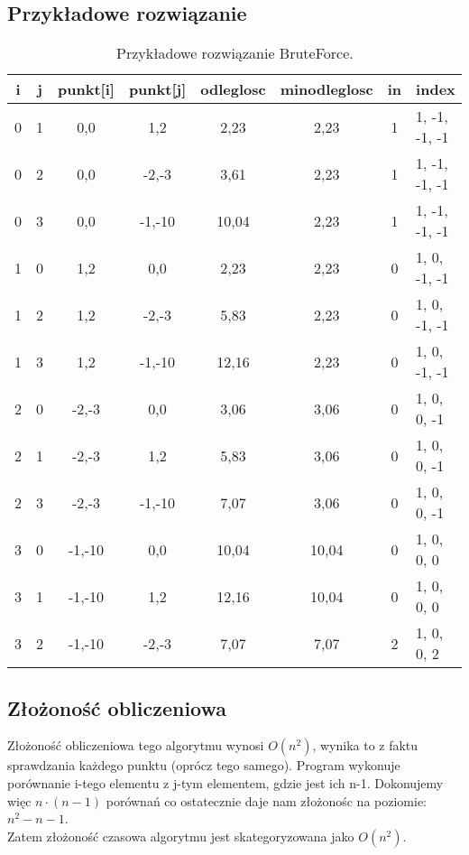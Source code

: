 \documentclass[12pt,twoside]{article}
\begin{document}
\subsection{Przykładowe rozwiązanie}
\begin{table}[ht]
    \centering
    \begin{tabularx}{\textwidth}{|c|c|c|c|c|c|c|X|}
        \hline
        \textbf{i} & \textbf{j} & \textbf{punkt[i]} & \textbf{punkt[j]} & \textbf{odleglosc} & \textbf{minodleglosc} & \textbf{in} & \textbf{index} \\
        \hline
        0 & 1 & 0,0 & 1,2 & 2,23 & 2,23 & 1 & 1, -1, -1, -1 \\
        \hline
        0 & 2 & 0,0 & -2,-3 & 3,61 & 2,23 & 1 & 1, -1, -1, -1 \\
        \hline
        0 & 3 & 0,0 & -1,-10 & 10,04 & 2,23 & 1 & 1, -1, -1, -1 \\
        \hline
        1 & 0 & 1,2  & 0,0 & 2,23 & 2,23 & 0 & 1, 0, -1, -1 \\
        \hline
        1 & 2 & 1,2  & -2,-3 & 5,83 & 2,23 & 0 & 1, 0, -1, -1 \\
        \hline
        1 & 3 & 1,2  & -1,-10 & 12,16 & 2,23 & 0 & 1, 0, -1, -1 \\
        \hline
        2 & 0 & -2,-3  & 0,0 & 3,06 & 3,06 & 0 & 1, 0, 0, -1 \\
		\hline
        2 & 1 & -2,-3  & 1,2 & 5,83 & 3,06 & 0 & 1, 0, 0, -1 \\
		\hline
        2 & 3 & -2,-3  & -1,-10 & 7,07 & 3,06 & 0 & 1, 0, 0, -1 \\
		\hline
        3 & 0 & -1,-10  & 0,0 & 10,04 & 10,04 & 0 & 1, 0, 0, 0 \\
        \hline
        3 & 1 & -1,-10  & 1,2 & 12,16 & 10,04 & 0 & 1, 0, 0, 0 \\
		\hline
        3 & 2 & -1,-10  & -2,-3 & 7,07 & 7,07 & 2 & 1, 0, 0, 2\\
		\hline
    \end{tabularx}
    \caption{Przykładowe rozwiązanie BruteForce.}
    \label{tab:bruteforceprzyklad}
\end{table}

\subsection{Złożoność obliczeniowa}
Złożoność obliczeniowa tego algorytmu wynosi \(O(n^2)\), wynika to z faktu sprawdzania każdego punktu (oprócz tego samego). 
Program wykonuje porównanie i-tego elementu z j-tym elementem, gdzie jest ich n-1.
Dokonujemy więc \(n\cdot(n-1)\) porównań co ostatecznie daje nam złożonośc na poziomie: \(n^2-n-1\).\\
Zatem złożoność czasowa algorytmu jest skategoryzowana jako \(O(n^2)\).
\end{document}
